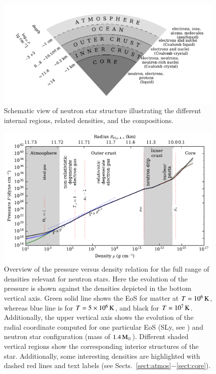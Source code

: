 \begin{figure}[t!]
\centering
\includegraphics[width=15.5cm]{figs/slice/atmos.pdf}
\caption{
Schematic view of neutron star structure illustrating the different internal regions, related densities, and the compositions.
}
\end{figure}


\begin{figure}[t!]
\centering
\includegraphics[width=15.5cm]{figs/eos/eos.pdf}
\caption{\label{fig:eos}
Overview of the pressure versus density relation for the full range of densities relevant for neutron stars.
Here the evolution of the pressure is shown against the densities depicted in the bottom vertical axis.
Green solid line shows the EoS for matter at $T=10^6\, \mathrm{K}$, whereas blue line is for $T=5 \times 10^{6}\, \mathrm{K}$, and black for $T=10^7 \, \mathrm{K}$.
Additionally, the upper vertical axis shows the evolution of the radial coordinate computed for one particular EoS (SLy, see ) and neutron star configuration (mass of $1.4\, \mathrm{M}_{\odot}$).
Different shaded vertical regions show the corresponding interior structures of the star.
Additionally, some interesting densities are highlighted with dashed red lines and text labels (see Sects.~\ref{sect:atmos}$-$\ref{sect:core}). 
}
\end{figure}


